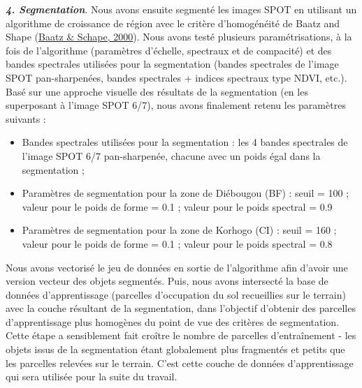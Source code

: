 \documentclass[12pt,twoside]{reedthesis}
\providecommand{\tightlist}{%
  \setlength{\itemsep}{0pt}\setlength{\parskip}{0pt}}
\begin{document}
\textbf{\emph{4. Segmentation}}. Nous avons ensuite segmenté les images SPOT en utilisant un algorithme de croissance de région avec le critère d'homogénéité de Baatz and Shape (\protect\hyperlink{ref-baatz_schape_2000}{Baatz \& Schape, 2000}). Nous avons testé plusieurs paramétrisations, à la fois de l'algorithme (paramètres d'échelle, spectraux et de compacité) et des bandes spectrales utilisées pour la segmentation (bandes spectrales de l'image SPOT pan-sharpenées, bandes spectrales + indices spectraux type NDVI, etc.). Basé sur une approche visuelle des résultats de la segmentation (en les superposant à l'image SPOT 6/7), nous avons finalement retenu les paramètres suivants :
\begin{itemize}
\tightlist
\item
  Bandes spectrales utilisées pour la segmentation : les 4 bandes spectrales de l'image SPOT 6/7 pan-sharpenée, chacune avec un poids égal dans la segmentation ;
\item
  Paramètres de segmentation pour la zone de Diébougou (BF) : seuil = 100 ; valeur pour le poids de forme = 0.1 ; valeur pour le poids spectral = 0.9
\item
  Paramètres de segmentation pour la zone de Korhogo (CI) : seuil = 160 ; valeur pour le poids de forme = 0.1 ; valeur pour le poids spectral = 0.8
\end{itemize}
Nous avons vectorisé le jeu de données en sortie de l'algorithme afin d'avoir une version vecteur des objets segmentés. Puis, nous avons intersecté la base de données d'apprentissage (parcelles d'occupation du sol recueillies sur le terrain) avec la couche résultant de la segmentation, dans l'objectif d'obtenir des parcelles d'apprentissage plus homogènes du point de vue des critères de segmentation. Cette étape a sensiblement fait croître le nombre de parcelles d'entraînement - les objets issus de la segmentation étant globalement plus fragmentés et petits que les parcelles relevées sur le terrain. C'est cette couche de données d'apprentissage qui sera utilisée pour la suite du travail.\\
\end{document}
